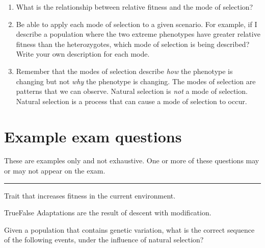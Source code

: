 \documentclass[letterpaper]{tufte-handout}
\begin{document}
\begin{enumerate}
	\item What is the relationship between relative fitness and the mode of selection?

	\item Be able to apply each mode of selection to a given scenario.  For example, if I describe a population where the two extreme phenotypes have greater relative fitness than the heterozygotes, which mode of selection is being described?  Write your own description for each mode.
	
	\item Remember that the modes of selection describe \emph{how} the phenotype is changing but not \emph{why} the phenotype is changing. The modes of selection are patterns that we can observe. Natural selection is \emph{not} a mode of selection. Natural selection is a process that can cause a mode of selection to occur. 
	

\end{enumerate}

\section*{Example exam questions}

These are examples only and not exhaustive. One or more of these questions may or may not appear on the exam.

\bigskip

\noindent \rule{1in}{0.4pt} Trait that increases fitness in the current environment.

\bigskip

\noindent True\hspace{1em}False\hspace{1em} Adaptations are the result of descent with modification. 

\bigskip

\noindent Given a population that contains genetic variation, what is the correct sequence of the following events, under the influence of natural selection?
\end{document}

